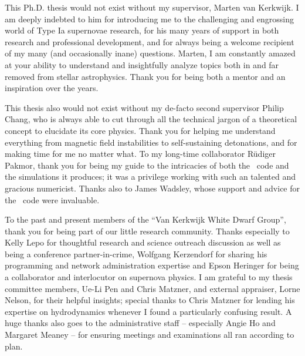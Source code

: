 \documentclass{ut-thesis}
\begin{document}
\begin{preliminary}

\cleardoublepage


\begin{acknowledgements}

This Ph.D. thesis would not exist without my supervisor, Marten van Kerkwijk.  I am deeply indebted to him for introducing me to the challenging and engrossing world of Type Ia supernovae research, for his many years of support in both research and professional development, and for always being a welcome recipient of my many (and occasionally inane) questions.  Marten, I am constantly amazed at your ability to understand and insightfully analyze topics both in and far removed from stellar astrophysics.  Thank you for being both a mentor and an inspiration over the years.

This thesis also would not exist without my de-facto second supervisor Philip Chang, who is always able to cut through all the technical jargon of a theoretical concept to elucidate its core physics.  Thank you for helping me understand everything from magnetic field instabilities to self-sustaining detonations, and for making time for me no matter what.  To my long-time collaborator R\"{u}diger Pakmor, thank you for being my guide to the intricacies of both the \arepo\ code and the simulations it produces; it was a privilege working with such an talented and gracious numericist.  Thanks also to James Wadsley, whose support and advice for the \gasoline\ code were invaluable.

To the past and present members of the ``Van Kerkwijk White Dwarf Group'', thank you for being part of our little research community.  Thanks especially to Kelly Lepo for thoughtful research and science outreach discussion as well as being a conference partner-in-crime, Wolfgang Kerzendorf for sharing his programming and network administration expertise and Epson Heringer for being a collaborator and interlocutor on supernova physics.  I am grateful to my thesis committee members, Ue-Li Pen and Chris Matzner, and external appraiser, Lorne Nelson, for their helpful insights; special thanks to Chris Matzner for lending his expertise on hydrodynamics whenever I found a particularly confusing result.  A huge thanks also goes to the administrative staff -- especially Angie Ho and Margaret Meaney -- for ensuring meetings and examinations all ran according to plan.


\end{acknowledgements}
\end{preliminary}
\end{document}
